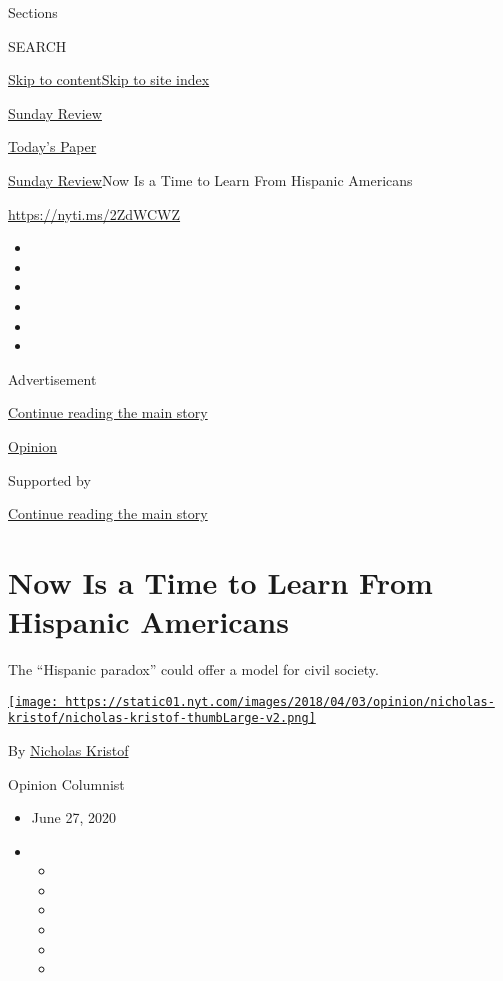 Sections

SEARCH

\protect\hyperlink{site-content}{Skip to
content}\protect\hyperlink{site-index}{Skip to site index}

\href{https://www.nytimes.com/section/opinion/sunday}{Sunday Review}

\href{https://myaccount.nytimes.com/auth/login?response_type=cookie\&client_id=vi}{}

\href{https://www.nytimes.com/section/todayspaper}{Today's Paper}

\href{/section/opinion/sunday}{Sunday Review}\textbar{}Now Is a Time to
Learn From Hispanic Americans

\href{https://nyti.ms/2ZdWCWZ}{https://nyti.ms/2ZdWCWZ}

\begin{itemize}
\item
\item
\item
\item
\item
\item
\end{itemize}

Advertisement

\protect\hyperlink{after-top}{Continue reading the main story}

\href{/section/opinion}{Opinion}

Supported by

\protect\hyperlink{after-sponsor}{Continue reading the main story}

\hypertarget{now-is-a-time-to-learn-from-hispanic-americans}{%
\section{Now Is a Time to Learn From Hispanic
Americans}\label{now-is-a-time-to-learn-from-hispanic-americans}}

The ``Hispanic paradox'' could offer a model for civil society.

\href{https://www.nytimes.com/column/nicholas-kristof}{\texttt{[image: https://static01.nyt.com/images/2018/04/03/opinion/nicholas-kristof/nicholas-kristof-thumbLarge-v2.png]}}

By \href{https://www.nytimes.com/column/nicholas-kristof}{Nicholas
Kristof}

Opinion Columnist

\begin{itemize}
\item
  June 27, 2020
\item
  \begin{itemize}
  \item
  \item
  \item
  \item
  \item
  \item
  \end{itemize}
\end{itemize}

